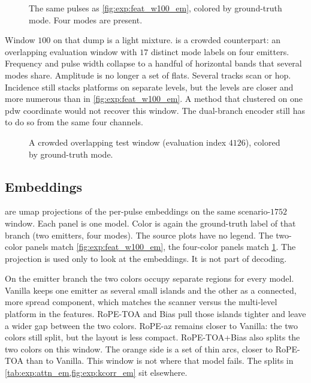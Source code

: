 \begin{figure}[tbp]
  \centering
  \caption{The same pulses as \cref{fig:exp:feat_w100_em}, colored by ground-truth mode. Four modes are present.}
  \label{fig:exp:feat_w100_md}
\end{figure}

Window $100$ on that dump is a light mixture.
 is a crowded counterpart: an overlapping evaluation window with $17$ distinct mode labels on four emitters.
Frequency and pulse width collapse to a handful of horizontal bands that several modes share.
Amplitude is no longer a set of flats. Several tracks scan or hop.
Incidence still stacks platforms on separate levels, but the levels are closer and more numerous than in \cref{fig:exp:feat_w100_em}.
A method that clustered on one \gls{pdw} coordinate would not recover this window.
The dual-branch encoder still has to do so from the same four channels.

\begin{figure}[tbp]
  \centering
  \caption{A crowded overlapping test window (evaluation index $4126$), colored by ground-truth mode.}
  \label{fig:exp:feat_maxmode}
\end{figure}

\subsection*{Embeddings}\label{sec:exp:qualitative:embed}

 are \gls{umap} projections of the per-pulse embeddings on the same scenario-$1752$ window.
Each panel is one model.
Color is again the ground-truth label of that branch (two emitters, four modes).
The source plots have no legend. The two-color panels match \cref{fig:exp:feat_w100_em}, the four-color panels match \cref{fig:exp:feat_w100_md}.
The projection is used only to look at the embeddings. It is not part of decoding.

On the emitter branch the two colors occupy separate regions for every model.
Vanilla keeps one emitter as several small islands and the other as a connected, more spread component, which matches the scanner versus the multi-level platform in the features.
RoPE-TOA and Bias pull those islands tighter and leave a wider gap between the two colors.
RoPE-az remains closer to Vanilla: the two colors still split, but the layout is less compact.
RoPE-TOA+Bias also splits the two colors on this window. The orange side is a set of thin arcs, closer to RoPE-TOA than to Vanilla.
This window is not where that model fails. The splits in \cref{tab:exp:attn_em,fig:exp:kcorr_em} sit elsewhere.

